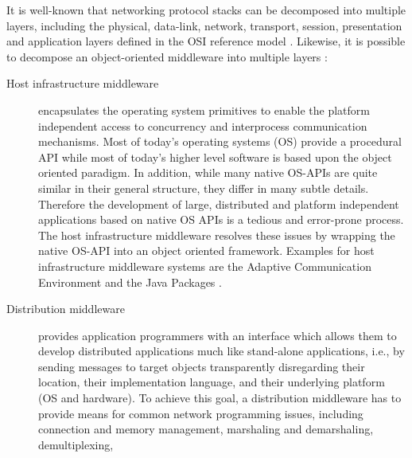 \documentclass[a4paper, 10pt]{book}
\begin{document}
            It is well-known that
            networking protocol stacks can be decomposed into multiple layers,
            including the physical, data-link, network, transport, session,
            presentation and application layers defined in the OSI reference
            model \cite{black91}. Likewise, it is possible to decompose an
            object-oriented middleware into multiple layers \cite{ss01, sh02a}:
            \begin{description}
                \item[Host infrastructure middleware] encapsulates the
                    operating system primitives to enable the platform independent
                    access to concurrency and interprocess communication
                    mechanisms. 
                    Most of today's operating systems (OS) provide a procedural API
                    while most of today's higher level software is based upon the object
                    oriented paradigm.
                    In addition, while many native OS-APIs are quite similar in their
                    general structure, they differ in many subtle details. Therefore the
                    development of large, distributed and platform independent
                    applications based on native OS APIs is a tedious and error-prone
                    process.
                    The host infrastructure middleware resolves these issues by wrapping
                    the native OS-API into an object oriented framework.
                    Examples for host infrastructure middleware systems are the
                    Adaptive Communication Environment \cite{sh02a,sh02b} and the Java
                    Packages \cite{agh00}.
                \item[Distribution middleware] provides application programmers
                    with an interface which allows them to develop distributed
                    applications much like stand-alone applications, i.e., by sending
                    messages to target objects transparently disregarding their
                    location, their implementation language, and their underlying
                    platform (OS and hardware). 
                    To achieve this goal, a distribution middleware has to provide means
                    for common network programming issues, including connection and memory
                    management, marshaling and demarshaling, demultiplexing,

\end{description}
\end{document}
